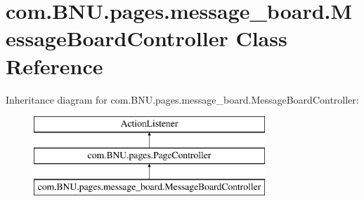 \hypertarget{classcom_1_1_b_n_u_1_1pages_1_1message__board_1_1_message_board_controller}{}\section{com.\+B\+N\+U.\+pages.\+message\+\_\+board.\+Message\+Board\+Controller Class Reference}
\label{classcom_1_1_b_n_u_1_1pages_1_1message__board_1_1_message_board_controller}
Inheritance diagram for com.\+B\+N\+U.\+pages.\+message\+\_\+board.\+Message\+Board\+Controller\+:\begin{figure}[H]
\begin{center}
\leavevmode
\includegraphics[height=3.000000cm]{classcom_1_1_b_n_u_1_1pages_1_1message__board_1_1_message_board_controller}
\end{center}
\end{figure}
